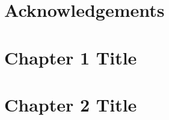 \documentclass[12pt]{report}
\begin{document}
    
    \begin{spacing}{1.0}
        
            \newpage
        
            \thispagestyle{empty}
                \newpage
        
            \thispagestyle{empty}
                \newpage
    \end{spacing}

        \setcounter{page}{4} %
\begin{justify}
\begin{spacing}{1.0}



\end{spacing}
\newpage

\chapter*{} %


\chapter*{Acknowledgements}


\begin{spacing}{1.0}
\tableofcontents 
    \newpage
    
\listoffigures
    \newpage

\listoftables
\end{spacing}
    \newpage

    \setcounter{page}{1}
    
\chapter{Chapter 1 Title}


\chapter{Chapter 2 Title}



\end{justify}
\end{document}
